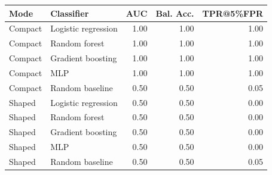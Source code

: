 \begin{tabular}{llrrr}
\toprule
\textbf{Mode} & \textbf{Classifier} & \textbf{AUC} & \textbf{Bal. Acc.} & \textbf{TPR@5\%FPR} \\
\midrule
Compact & Logistic regression & 1.00 & 1.00 & 1.00 \\
Compact & Random forest & 1.00 & 1.00 & 1.00 \\
Compact & Gradient boosting & 1.00 & 1.00 & 1.00 \\
Compact & MLP & 1.00 & 1.00 & 1.00 \\
Compact & Random baseline & 0.50 & 0.50 & 0.05 \\
Shaped & Logistic regression & 0.50 & 0.50 & 0.00 \\
Shaped & Random forest & 0.50 & 0.50 & 0.00 \\
Shaped & Gradient boosting & 0.50 & 0.50 & 0.00 \\
Shaped & MLP & 0.50 & 0.50 & 0.00 \\
Shaped & Random baseline & 0.50 & 0.50 & 0.05 \\
\bottomrule
\end{tabular}
